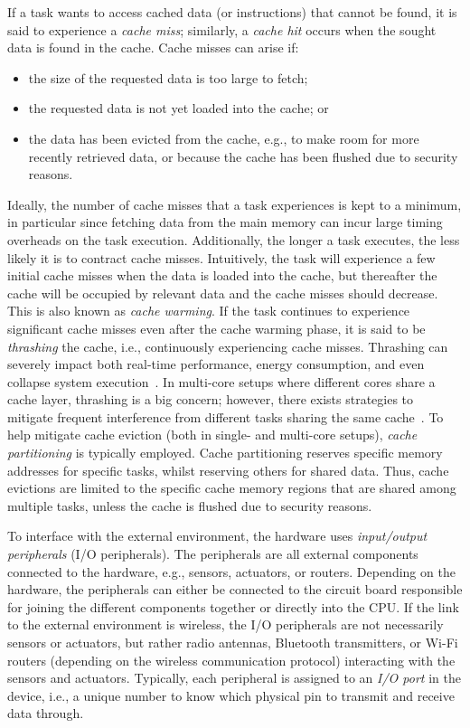 If a task wants to access cached data (or instructions) that cannot be found, it is said to experience a \emph{cache miss}; similarly, a \emph{cache hit} occurs when the sought data is found in the cache.
Cache misses can arise if:
%
\begin{itemize}
    \item the size of the requested data is too large to fetch;
    \item the requested data is not yet loaded into the cache; or
    \item the data has been evicted from the cache, e.g., to make room for more recently retrieved data, or because the cache has been flushed due to security reasons.
\end{itemize}
%
Ideally, the number of cache misses that a task experiences is kept to a minimum, in particular since fetching data from the main memory can incur large timing overheads on the task execution.
Additionally, the longer a task executes, the less likely it is to contract cache misses.
Intuitively, the task will experience a few initial cache misses when the data is loaded into the cache, but thereafter the cache will be occupied by relevant data and the cache misses should decrease.
This is also known as \emph{cache warming}.
If the task continues to experience significant cache misses even after the cache warming phase, it is said to be \emph{thrashing} the cache, i.e., continuously experiencing cache misses.
Thrashing can severely impact both real-time performance, energy consumption, and even collapse system execution~\cite{Wadleigh:2000}.
In multi-core setups where different cores share a cache layer, thrashing is a big concern; however, there exists strategies to mitigate frequent interference from different tasks sharing the same cache~\cite{Brandenburg:2011}.
To help mitigate cache eviction (both in single- and multi-core setups), \emph{cache partitioning} is typically employed.
Cache partitioning reserves specific memory addresses for specific tasks, whilst reserving others for shared data.
Thus, cache evictions are limited to the specific cache memory regions that are shared among multiple tasks, unless the cache is flushed due to security reasons.

To interface with the external environment, the hardware uses \emph{input/output peripherals} (I/O peripherals).
The peripherals are all external components connected to the hardware, e.g., sensors, actuators, or routers.
Depending on the hardware, the peripherals can either be connected to the circuit board responsible for joining the different components together or directly into the CPU.
If the link to the external environment is wireless, the I/O peripherals are not necessarily sensors or actuators, but rather radio antennas, Bluetooth transmitters, or Wi-Fi routers (depending on the wireless communication protocol) interacting with the sensors and actuators.
Typically, each peripheral is assigned to an \emph{I/O port} in the device, i.e., a unique number to know which physical pin to transmit and receive data through. 

